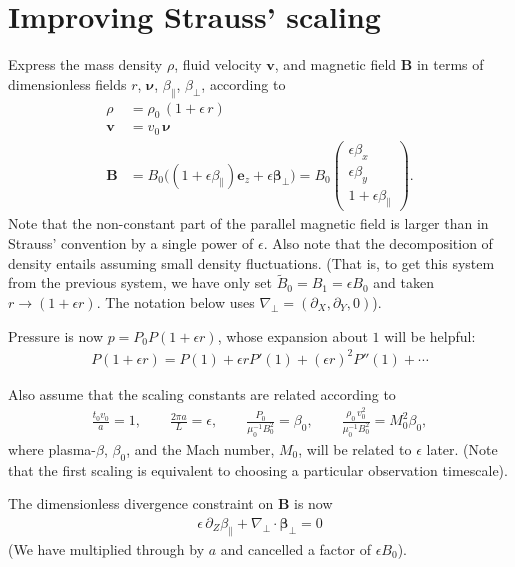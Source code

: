 \documentclass{article}
\newcommand{\para}{\parallel}
\newcommand{\ep}{\epsilon}
\newcommand{\np}{\nabla_\perp}
\newcommand{\p}{\partial}
\newcommand{\til}[1]{\widetilde{ #1 }}
\newcommand{\pmat} [1] {\begin{pmatrix} #1 \end{pmatrix}}
\begin{document}
\section{Improving Strauss' scaling}
Express the mass density $\rho$, fluid velocity $\bm{v}$, and magnetic field $\bm{B}$ in terms of dimensionless fields $r$, $\bm{\nu}$, $\beta_\parallel$, $\beta_\perp$, according to
\begin{align*}
    \rho &= \rho_0\,(1 + \epsilon\,r)\\
    \bm{v} & = v_0\,\bm{\nu}\\
    \bm{B} & = B_0\bigg((1 + \ep\beta_\para)\bm{e}_z + \ep\bm{\beta}_\perp\bigg) = B_0 \pmat{\ep\beta_x \\ \ep\beta_y \\ 1+\ep\beta_\para} .
\end{align*}
Note that the non-constant part of the parallel magnetic field is larger than in Strauss' convention by a single power of $\epsilon$. Also note that the decomposition of density entails assuming small density fluctuations. (That is, to get this system from the previous system, we have only set $\til{B}_0 = B_1 = \ep B_0$ and taken $r\rightarrow (1+\ep r)$. The notation below uses $\np = (\p_X, \p_Y, 0)$). 

Pressure is now $p=P_0P(1+\ep r)$, whose expansion about $1$ will be helpful: 
\begin{align*}
    P(1+\ep r) = P(1) + \ep rP'(1) + (\ep r)^2 P''(1) + \cdots 
\end{align*}

Also assume that the scaling constants are related according to
\begin{align*}
    \frac{t_0 v_0}{a} = 1, \qquad 
    \frac{2\pi a}{L} = \ep, \qquad 
    \frac{P_0}{\mu_0^{-1}B_0^2} = \beta_0, \qquad 
    \frac{\rho_0\,v_0^2}{\mu_0^{-1}B_0^2} = M_0^2\beta_0, 
\end{align*}
where plasma-$\beta$, $\beta_0$, and the Mach number, $M_0$, will be related to $\epsilon$ later. (Note that the first scaling is equivalent to choosing a particular observation timescale). 

The dimensionless divergence constraint on $\bm{B}$ is now
\begin{align}
\epsilon\,\partial_Z\beta_\parallel + \np\cdot\bm{\beta}_\perp = 0 
\end{align}
(We have multiplied through by $a$ and cancelled a factor of $\ep B_0$). 
\end{document}
